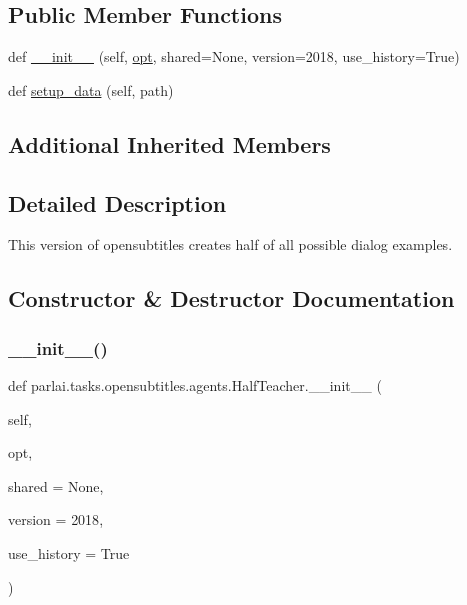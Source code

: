 \subsection*{Public Member Functions}
\begin{DoxyCompactItemize}
\item 
def \hyperlink{classparlai_1_1tasks_1_1opensubtitles_1_1agents_1_1HalfTeacher_aea4e464ad2d0ac4af96d426b171324bc}{\+\_\+\+\_\+init\+\_\+\+\_\+} (self, \hyperlink{classparlai_1_1core_1_1teachers_1_1FbDialogTeacher_af7a9ec497b9cd0292d7b8fa220da7c28}{opt}, shared=None, version=\textquotesingle{}2018\textquotesingle{}, use\+\_\+history=True)
\item 
def \hyperlink{classparlai_1_1tasks_1_1opensubtitles_1_1agents_1_1HalfTeacher_a36081b74536cdad3bc3673b324da1f02}{setup\+\_\+data} (self, path)
\end{DoxyCompactItemize}
\subsection*{Additional Inherited Members}


\subsection{Detailed Description}
\begin{DoxyVerb}This version of opensubtitles creates half of all possible dialog examples.
\end{DoxyVerb}
 

\subsection{Constructor \& Destructor Documentation}
\mbox{\label{classparlai_1_1tasks_1_1opensubtitles_1_1agents_1_1HalfTeacher_aea4e464ad2d0ac4af96d426b171324bc}} 
\subsubsection{\texorpdfstring{\+\_\+\+\_\+init\+\_\+\+\_\+()}{\_\_init\_\_()}}
{\footnotesize\ttfamily def parlai.\+tasks.\+opensubtitles.\+agents.\+Half\+Teacher.\+\_\+\+\_\+init\+\_\+\+\_\+ (\begin{DoxyParamCaption}\item[{}]{self,  }\item[{}]{opt,  }\item[{}]{shared = {\ttfamily None},  }\item[{}]{version = {\ttfamily \textquotesingle{}2018\textquotesingle{}},  }\item[{}]{use\+\_\+history = {\ttfamily True} }\end{DoxyParamCaption})}



